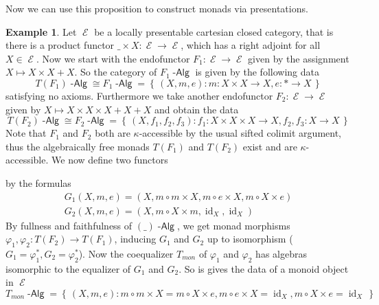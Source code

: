 \documentclass[a4paper,11pt,oneside,openany]{scrbook}
\DeclareMathOperator{\Alg}{-\mathsf{Alg}}
\newcommand{\from}{\colon}
\newcommand{\iso}{\cong}
\newcommand{\set}[2]{\left\lbrace\,#1\colon #2 \,\right\rbrace}
\DeclareMathOperator{\E}{\mathcal{E}}
\DeclareMathOperator{\id}{id}
\theoremstyle{definition}
\theoremstyle{definition}
\newtheorem{exmp}[thm]{Example}
\begin{document}
Now we can use this proposition to construct monads via presentations. 

\begin{exmp}
   Let $\E$ be a locally presentable cartesian closed category, that is there is a product functor $\_ \times X \from \E \to \E$, which has a right adjoint for 
   all $X \in \E$. Now we start with the endofunctor $F_{1} \from \E \to \E$ given by the assignment $X \mapsto X \times X + X$. So the category of 
   $F_{1}\Alg$ is given by the following data
      \begin{equation*}
         T(F_{1})\Alg \iso F_{1}\Alg = \set{(X,m,e)}{m\from X \times X \to X,e \from \ast \to X }
      \end{equation*}
   satisfying no axioms. Furthermore we take another endofunctor $F_{2} \from \E \to \E$ given by $X \mapsto X \times X \times X + X + X$ and obtain the data 
      \begin{equation*}
         T(F_{2})\Alg \iso F_{2}\Alg = \set{(X,f_{1},f_{2},f_{3})}{f_{1}\from X \times X \times X \to X, f_{2},f_{3} \from X \to X}
      \end{equation*}
   Note that $F_{1}$ and $F_{2}$ both are $\kappa$-accessible by the usual sifted colimit argument, thus the algebraically free monads $T(F_{1})$ and 
   $T(F_{2})$ exist and are $\kappa$-accessible. We now define two functors 
      \begin{center}
      \end{center}
   by the formulas
      \begin{align*}
         G_{1}(X,m,e) = (X, m \circ m \times X, m \circ e \times X, m \circ X \times e) \\
         G_{2}(X,m,e) = (X, m \circ X \times m, \id_{X}, \id_{X})
      \end{align*}
   By fullness and faithfulness of $(\_)\Alg$, we get monad morphisms $\varphi_{1},\varphi_{2} \from T(F_{2}) \to T(F_{1})$, inducing $G_{1}$ and $G_{2}$ up to
   isomorphism ($G_{1} = \varphi_{1}^{\ast},G_{2} = \varphi_{2}^{\ast}$). Now the coequalizer $T_{mon}$ of $\varphi_{1}$ and $\varphi_{2}$ has algebras 
   isomorphic to the equalizer of $G_{1}$ and $G_{2}$. So is gives the data of a monoid object in $\E$
      \begin{equation*}
         T_{mon}\Alg = \set{(X,m,e)}{m \circ m \times X = m \circ X \times e, m \circ e \times X = \id_{X}, m \circ X \times e = \id_{X}}
      \end{equation*}
\end{exmp}
\end{document}
